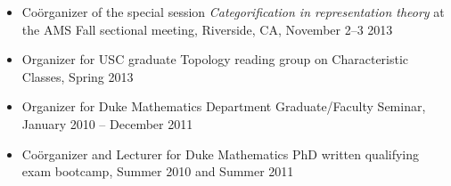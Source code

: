 \documentclass[10pt]{article}
\begin{document}
\begin{itemize}
\item Co\"{o}rganizer of the special session \emph{Categorification in representation theory} at the AMS Fall sectional meeting,
Riverside, CA, November 2--3 2013

\item Organizer for USC graduate Topology reading group on Characteristic Classes, Spring 2013

\item Organizer for Duke Mathematics Department Graduate/Faculty Seminar, January 2010 -- December 2011

\item Co\"{o}rganizer and Lecturer for Duke Mathematics PhD written qualifying exam bootcamp, Summer 2010 and Summer 2011
\end{itemize}






\end{document}
